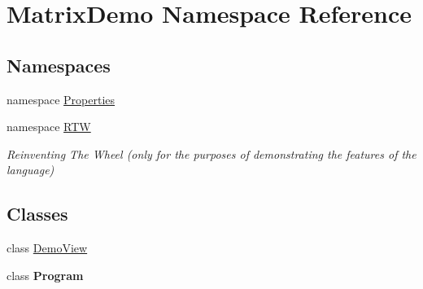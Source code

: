 \hypertarget{namespace_matrix_demo}{}\section{Matrix\+Demo Namespace Reference}
\label{namespace_matrix_demo}
\subsection*{Namespaces}
\begin{DoxyCompactItemize}
\item 
namespace \mbox{\hyperlink{namespace_matrix_demo_1_1_properties}{Properties}}
\item 
namespace \mbox{\hyperlink{namespace_matrix_demo_1_1_r_t_w}{R\+TW}}
\begin{DoxyCompactList}\small\item\em Reinventing The Wheel (only for the purposes of demonstrating the features of the language) \end{DoxyCompactList}\end{DoxyCompactItemize}
\subsection*{Classes}
\begin{DoxyCompactItemize}
\item 
class \mbox{\hyperlink{class_matrix_demo_1_1_demo_view}{Demo\+View}}
\item 
class {\bfseries Program}
\end{DoxyCompactItemize}

